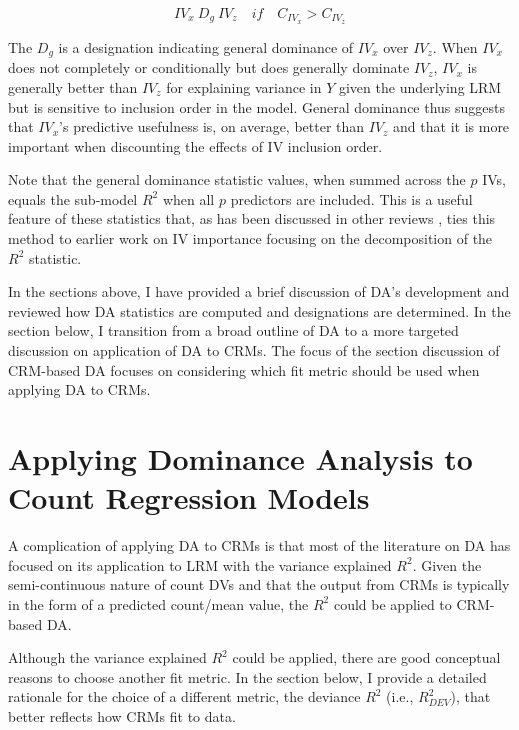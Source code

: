 \documentclass[doc]{apa7}
\begin{document}
	\begin{equation}
		IV_x \ D_g \ IV_z \quad if \quad C_{IV_x} > C_{IV_z}
		\label{eq:gendom}
	\end{equation}
	
	The $D_g$ is a designation indicating general dominance of $IV_x$ over $IV_z$.	
	When $IV_x$ does not completely or conditionally but does generally dominate $IV_z$, $IV_x$ is generally better than $IV_z$ for explaining variance in $Y$ given the underlying LRM but is sensitive to inclusion order in the model.
	General dominance thus suggests that $IV_x$'s predictive usefulness is, on average, better than $IV_z$ and that it is more important when discounting the effects of IV inclusion order.
	
	Note that the  general dominance statistic values, when summed across the $p$ IVs, equals the sub-model $R^2$ when all $p$ predictors are included.
	This is a useful feature of these statistics that, as has been discussed in other reviews \parencite{gromping2007estimators,johnson2004history}, ties this method to earlier work on IV importance focusing on the decomposition of the $R^2$ statistic.

	In the sections above, I have provided a brief discussion of DA's development and reviewed how DA statistics are computed and designations are determined.
	In the section below, I transition from a broad outline of DA to a more targeted discussion on application of DA to CRMs.
	The focus of the section discussion of CRM-based DA focuses on considering which fit metric should be used when applying DA to CRMs.
	
\section{Applying Dominance Analysis to Count Regression Models}

	A complication of applying DA to CRMs is that most of the literature on DA has focused on its application to LRM with the variance explained $R^2$.
	Given the semi-continuous nature of count DVs and that the output from CRMs is typically in the form of a predicted count/mean value, the $R^2$ could be applied to CRM-based DA.
	
	Although the variance explained $R^2$ could be applied, there are good conceptual reasons to choose another fit metric. 
	In the section below, I provide a detailed rationale for the choice of a different metric, the deviance $R^2$ (i.e., $R^2_{DEV}$), that better reflects how CRMs fit to data. 
	
\end{document}

